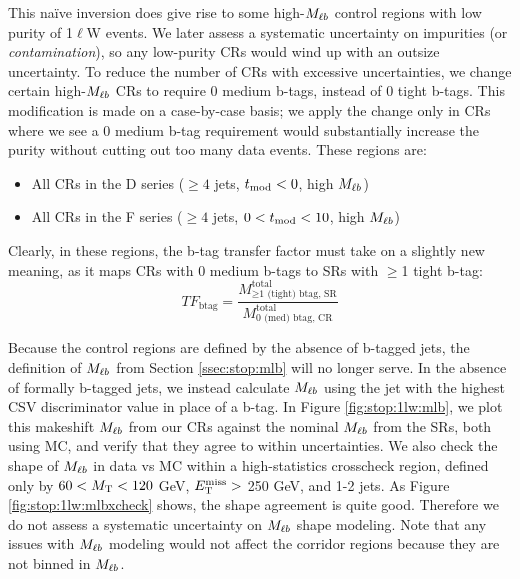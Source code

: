 This na\"{i}ve inversion does give rise to some high-$M_{\ell b}$ control regions with low
purity of 1$\ell$W events. We later assess a systematic uncertainty on
impurities (or \emph{contamination}), so any low-purity CRs would wind up
with an outsize uncertainty. To reduce the number of CRs with
excessive uncertainties, we change certain high-$M_{\ell b}$ CRs to
require 0 medium b-tags, instead of 0 tight b-tags. This modification
is made on a case-by-case basis; we apply the change only in CRs where
we see a 0 medium b-tag requirement would substantially increase the
purity without cutting out too many data events. These regions are:
\begin{itemize}
\item All CRs in the D series ($\geq 4$ jets, $t_\text{mod} < 0$, high $M_{\ell b}$)
\item All CRs in the F series ($\geq 4$ jets, $0 < t_\text{mod} < 10$, high $M_{\ell b}$)
\end{itemize}
Clearly, in these regions, the b-tag transfer factor must take
on a slightly new meaning, as it maps CRs with 0 medium b-tags to
SRs with $\geq$1 tight b-tag:
\begin{equation}
TF_\text{btag} = \frac{M_{\geq\text{1 (tight) btag,
      SR}}^\text{total}}{M_\text{0 (med) btag, CR}^\text{total}}
\end{equation}

Because the control regions are defined by the absence of
b-tagged jets, the definition of $M_{\ell b}$ from Section
\ref{ssec:stop:mlb} will no longer serve. In the absence of formally
b-tagged jets, we instead calculate $M_{\ell b}$ using the jet with
the highest CSV discriminator value in place of a b-tag.
In Figure \ref{fig:stop:1lw:mlb}, we plot this makeshift
$M_{\ell b}$ from our CRs against the nominal $M_{\ell b}$ from the
SRs, both using MC, and verify that they agree to within
uncertainties. We also check the shape of $M_{\ell b}$ in data vs MC
within a high-statistics crosscheck region, defined only by $60 < M_\text{T}
< 120$ GeV, $E_\text{T}^\text{miss} >$ 250 GeV, and 1-2 jets. As Figure
\ref{fig:stop:1lw:mlbxcheck} shows, the
shape agreement is quite good. Therefore we
do not assess a systematic uncertainty on $M_{\ell b}$ shape
modeling. Note that any issues with $M_{\ell b}$ modeling
would not affect the corridor regions because they are not binned in
$M_{\ell b}$.


